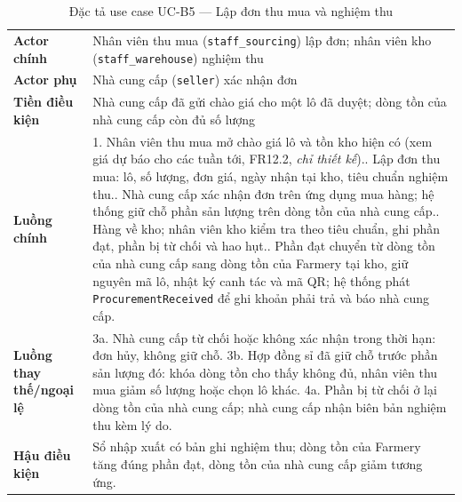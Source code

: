 \begingroup
\tblsetup
\begin{longtable}{L{3.00cm} L{12.25cm}}
\caption{Đặc tả use case UC-B5 --- Lập đơn thu mua và nghiệm thu}
\label{tab:uc-b5} \\
\toprule
{}
 \\
\midrule
\endfirsthead
\bottomrule
\endfoot
\textbf{Actor chính} & Nhân viên thu mua (\texttt{staff\_sourcing}) lập đơn; nhân viên kho (\texttt{staff\_warehouse}) nghiệm thu \\
\textbf{Actor phụ} & Nhà cung cấp (\texttt{seller}) xác nhận đơn \\
\textbf{Tiền điều kiện} & Nhà cung cấp đã gửi chào giá cho một lô đã duyệt; dòng tồn của nhà cung cấp còn đủ số lượng \\
\textbf{Luồng chính} &
1. Nhân viên thu mua mở chào giá lô và tồn kho hiện có (xem giá dự báo cho các tuần tới, FR12.2, \emph{chỉ thiết kế}).. Lập đơn thu mua: lô, số lượng, đơn giá, ngày nhận tại kho, tiêu chuẩn nghiệm thu.. Nhà cung cấp xác nhận đơn trên ứng dụng mua hàng; hệ thống giữ chỗ phần sản lượng trên dòng tồn của nhà cung cấp.. Hàng về kho; nhân viên kho kiểm tra theo tiêu chuẩn, ghi phần đạt, phần bị từ chối và hao hụt.. Phần đạt chuyển từ dòng tồn của nhà cung cấp sang dòng tồn của Farmery tại kho, giữ nguyên mã lô, nhật ký canh tác và mã QR; hệ thống phát \texttt{ProcurementReceived} để ghi khoản phải trả và báo nhà cung cấp. \\
\textbf{Luồng thay thế/ngoại lệ} &
3a. Nhà cung cấp từ chối hoặc không xác nhận trong thời hạn: đơn hủy, không giữ chỗ.\newline
3b. Hợp đồng sỉ đã giữ chỗ trước phần sản lượng đó: khóa dòng tồn cho thấy không đủ, nhân viên thu mua giảm số lượng hoặc chọn lô khác.\newline
4a. Phần bị từ chối ở lại dòng tồn của nhà cung cấp; nhà cung cấp nhận biên bản nghiệm thu kèm lý do. \\
\textbf{Hậu điều kiện} & Sổ nhập xuất có bản ghi nghiệm thu; dòng tồn của Farmery tăng đúng phần đạt, dòng tồn của nhà cung cấp giảm tương ứng. \\
\end{longtable}
\endgroup

